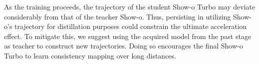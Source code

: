 

As the training proceeds, the trajectory of the student Show-o Turbo may deviate considerably from that of the teacher Show-o.
Thus, persisting in utilizing Show-o's trajectory for distillation purposes could constrain the ultimate acceleration effect. %
To mitigate this, we suggest using the acquired model from the past stage as teacher to construct new trajectories.
Doing so encourages the final Show-o Turbo to learn consistency mapping over long distances.





